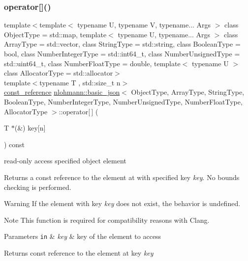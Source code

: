 \subsubsection{\texorpdfstring{operator[]()}{operator[]()}\hspace{0.1cm}{\footnotesize\ttfamily [6/10]}}
{\footnotesize\ttfamily template$<$template$<$ typename U, typename V, typename... Args $>$ class Object\+Type = std\+::map, template$<$ typename U, typename... Args $>$ class Array\+Type = std\+::vector, class String\+Type  = std\+::string, class Boolean\+Type  = bool, class Number\+Integer\+Type  = std\+::int64\+\_\+t, class Number\+Unsigned\+Type  = std\+::uint64\+\_\+t, class Number\+Float\+Type  = double, template$<$ typename U $>$ class Allocator\+Type = std\+::allocator$>$ \\
template$<$typename T , std\+::size\+\_\+t n$>$ \\
\hyperlink{classnlohmann_1_1basic__json_af677a29b0e66edc9f66e5167e4667071}{const\+\_\+reference} \hyperlink{classnlohmann_1_1basic__json}{nlohmann\+::basic\+\_\+json}$<$ Object\+Type, Array\+Type, String\+Type, Boolean\+Type, Number\+Integer\+Type, Number\+Unsigned\+Type, Number\+Float\+Type, Allocator\+Type $>$\+::operator\mbox{[}$\,$\mbox{]} (\begin{DoxyParamCaption}\item[{T $\ast$(\&)}]{key\mbox{[}n\mbox{]} }\end{DoxyParamCaption}) const\hspace{0.3cm}{\ttfamily [inline]}}



read-\/only access specified object element 

Returns a const reference to the element at with specified key {\itshape key}. No bounds checking is performed.

\begin{DoxyWarning}{Warning}
If the element with key {\itshape key} does not exist, the behavior is undefined.
\end{DoxyWarning}
\begin{DoxyNote}{Note}
This function is required for compatibility reasons with Clang.
\end{DoxyNote}

\begin{DoxyParams}[1]{Parameters}
\mbox{\tt in}  & {\em key} & key of the element to access\\
\hline
\end{DoxyParams}
\begin{DoxyReturn}{Returns}
const reference to the element at key {\itshape key} 
\end{DoxyReturn}

